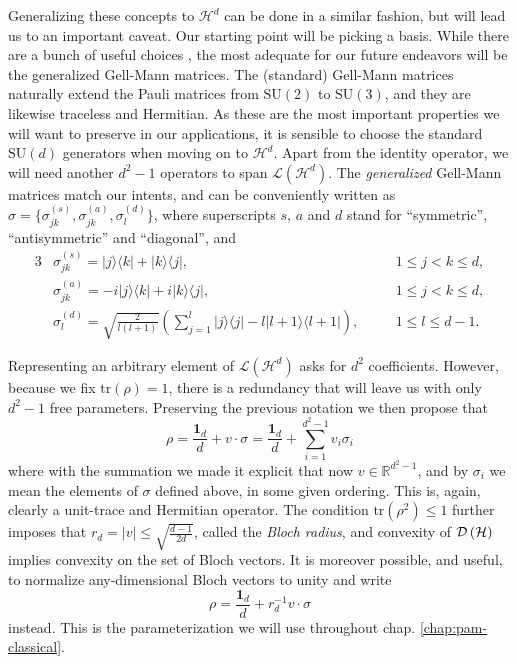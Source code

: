 		Generalizing these concepts to $\mathcal{H}^d$ can be done in a similar fashion, but will lead us to an important caveat. Our starting point will be picking a basis. While there are a bunch of useful choices \cite{bertlmann_2008_bloch}, the most adequate for our future endeavors will be the generalized Gell-Mann matrices. The (standard) Gell-Mann matrices naturally extend the Pauli matrices from $\text{SU}(2)$ to $\text{SU}(3)$, and they are likewise traceless and Hermitian. As these are the most important properties we will want to preserve in our applications, it is sensible to choose the standard $\text{SU}(d)$ generators when moving on to $\mathcal{H}^d$. Apart from the identity operator, we will need another $d^2 - 1$ operators to span $\mathcal{L}(\mathcal{H}^d)$. The \emph{generalized} Gell-Mann matrices match our intents, and can be conveniently written as $\sigma = \{ \sigma^{(s)}_{jk}, \sigma^{(a)}_{jk}, \sigma^{(d)}_l \}$, where superscripts $s$, $a$ and $d$ stand for ``symmetric'', ``antisymmetric'' and ``diagonal'', and
		\begin{alignat*}{3}
			&\sigma^{(s)}_{jk} = \lvert j \rangle \langle k \rvert + \lvert k \rangle \langle j \rvert, \quad &&1 \leq j < k \leq d, \\
			&\sigma^{(a)}_{jk} = -i\lvert j \rangle \langle k \rvert + i\lvert k \rangle \langle j \rvert, \quad &&1 \leq j < k \leq d, \\
			&\sigma^{(d)}_{l} = \sqrt{\frac{2}{l (l+1)}} \left( \sum_{j=1}^l \lvert j \rangle \langle j \rvert - l\lvert l + 1 \rangle \langle l + 1 \rvert \right), \quad &&1 \leq l \leq d - 1 .
		\end{alignat*}

		Representing an arbitrary element of $\mathcal{L}(\mathcal{H}^d)$ asks for $d^2$ coefficients. However, because we fix $\text{tr}(\rho) = 1$, there is a redundancy that will leave us with only $d^2 - 1$ free parameters. Preserving the previous notation we then propose that
		\begin{equation*}
			\rho = \frac{\mathbf{1}_d}{d} + v \cdot \sigma = \frac{\mathbf{1}_d}{d} + \sum_{i = 1}^{d^2 - 1} v_i \sigma_i
		\end{equation*}
		where with the summation we made it explicit that now $v \in \mathbb{R}^{d^2 - 1}$, and by $\sigma_i$ we mean the elements of $\sigma$ defined above, in some given ordering. This is, again, clearly a unit-trace and Hermitian operator. The condition $\text{tr}(\rho^2) \leq 1$ further imposes that $r_d = \lvert v \rvert \leq \sqrt{\frac{d - 1}{2d}}$, called the \emph{Bloch radius}, and convexity of $\mathcal{D}\left( \mathcal{H} \right)$ implies convexity on the set of Bloch vectors. It is moreover possible, and useful, to normalize any-dimensional Bloch vectors to unity and write
		\begin{equation}
			\rho = \frac{\mathbf{1}_d}{d} + r_d^{-1} v \cdot \sigma
			\label{eq:normalized-bloch-vector-representation}
		\end{equation}
		instead. This is the parameterization we will use throughout chap. \ref{chap:pam-classical}.
	
